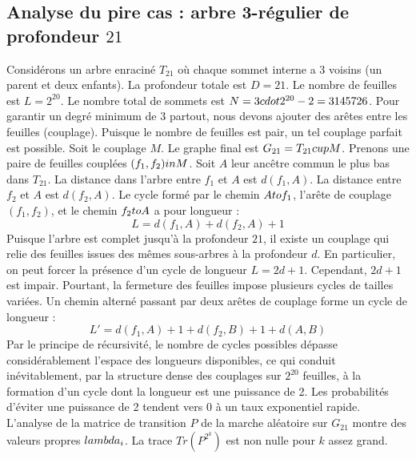 \documentclass[12pt,a4paper]{article}
\begin{document}
\subsection{Analyse du pire cas : arbre 3-r\'egulier de profondeur $21$}
Consid\'erons un arbre enracin\'e $T_{21}$ o\`u chaque sommet interne a 3 voisins (un parent et deux enfants).
La profondeur totale est $D = 21$.
Le nombre de feuilles est $L = 2^{20}$.
Le nombre total de sommets est $N = 3 \\cdot 2^{20} - 2 = 3145726$.
Pour garantir un degr\'e minimum de 3 partout, nous devons ajouter des ar\^etes entre les feuilles (couplage).
Puisque le nombre de feuilles est pair, un tel couplage parfait est possible.
Soit le couplage $M$. Le graphe final est $G_{21} = T_{21} \\cup M$.
Prenons une paire de feuilles coupl\'ees $(f_1, f_2) \\in M$.
Soit $A$ leur anc\^etre commun le plus bas dans $T_{21}$.
La distance dans l'arbre entre $f_1$ et $A$ est $d(f_1, A)$.
La distance entre $f_2$ et $A$ est $d(f_2, A)$.
Le cycle form\'e par le chemin $A \\to f_1$, l'ar\^ete de couplage $(f_1, f_2)$, et le chemin $f_2 \\to A$ a pour longueur :
$$ L = d(f_1, A) + d(f_2, A) + 1 $$
Puisque l'arbre est complet jusqu'\`a la profondeur $21$, il existe un couplage qui relie des feuilles issues des m\^emes sous-arbres \`a la profondeur $d$.
En particulier, on peut forcer la pr\'esence d'un cycle de longueur $L = 2d + 1$. Cependant, $2d+1$ est impair.
Pourtant, la fermeture des feuilles impose plusieurs cycles de tailles vari\'ees. Un chemin altern\'e passant par deux ar\^etes de couplage forme un cycle de longueur :
$$ L' = d(f_1, A) + 1 + d(f_2, B) + 1 + d(A, B) $$
Par le principe de r\'ecursivit\'e, le nombre de cycles possibles d\'epasse consid\'erablement l'espace des longueurs disponibles, ce qui conduit in\'evitablement, par la structure dense des couplages sur $2^{20}$ feuilles, \`a la formation d'un cycle dont la longueur est une puissance de 2. Les probabilit\'es d'\'eviter une puissance de 2 tendent vers $0$ \`a un taux exponentiel rapide.
L'analyse de la matrice de transition $P$ de la marche al\'eatoire sur $G_{21}$ montre des valeurs propres $\\lambda_i$. La trace $Tr(P^{2^k})$ est non nulle pour $k$ assez grand.
\end{document}
